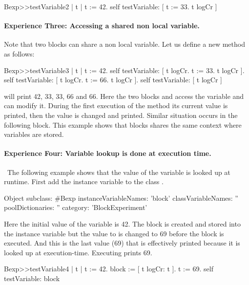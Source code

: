 \documentclass[a4paper,10pt,twoside]{book}
\begin{document}
\begin{code}{}
Bexp>>testVariable2
	| t |
	t := 42.
	self testVariable: [ t := 33. t logCr ]
\end{code}
\paragraph{Experience Three: Accessing a shared non local variable.}
Note that two blocks can share a non local variable. Let us define a new method  as follows:

\begin{code}{}
Bexp>>testVariable3
	| t |
	t := 42.
	self testVariable: [ t logCr. t := 33. t logCr ].
	self testVariable: [ t logCr. t := 66. t logCr ].
	self testVariable: [ t logCr ]
\end{code}

 will print 42, 33, 33, 66 and 66.
Here the two blocks \ct{[ t := 33. t logCr ]} and \ct{[ t := 66. t logCr ]} access the variable  and can modify it. During the first execution of the method  its current value  is printed, then the value is changed and printed. Similar situation occurs in the following block. This example shows that blocks shares the same context where variables are stored.

\paragraph{Experience Four: Variable lookup is done at execution time.}\
The following example shows that the value of the variable is looked up at runtime.
First add the instance variable \ct{block} to the class \ct{Bexp}.

\begin{code}{}
Object subclass: #Bexp
	instanceVariableNames: 'block'
	classVariableNames: ''
	poolDictionaries: ''
	category: 'BlockExperiment'
\end{code}

Here the initial value of the variable  is 42. The block is created and stored into the instance variable  but the value to  is changed to 69 before the block is executed. And this is the last value (69) that is effectively printed because it is looked up at execution-time. Executing  prints 69.



\begin{code}{}
Bexp>>testVariable4
	| t |
	t := 42.
	block := [ t logCr: t ].
	t := 69.
	self testVariable: block
\end{code}
\end{document}
